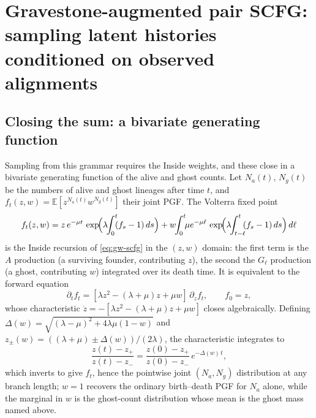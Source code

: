 \documentclass{article}
\newcommand{\E}{\mathbb{E}}
\newcommand{\ins}{\lambda}
\newcommand{\del}{\mu}
\begin{document}
\section{Gravestone-augmented pair SCFG: sampling latent histories conditioned on observed alignments}
\label{appendix:sampling_scfg}
 
\subsection{Closing the sum: a bivariate generating function}
Sampling from this grammar requires the Inside weights, and these close
in a bivariate generating function of the alive and ghost counts.
Let $N_a(t)$, $N_g(t)$ be the numbers of alive and ghost lineages
after time $t$, and $f_t(z,w)=\E[z^{N_a(t)}w^{N_g(t)}]$ their joint PGF.
The Volterra fixed point
\begin{equation}
\label{eq:volterra}
f_t(z,w) = z\,e^{-\del t}\,\exp\!\Bigl(\ins\!\!\int_0^{t}\!\! (f_s - 1)\, ds\Bigr)
  + w\!\!\int_0^{t}\!\!\del e^{-\del\ell}\,\exp\!\Bigl(\ins\!\!\int_{t-\ell}^{t}\!\! (f_s - 1)\, ds\Bigr)\,d\ell
\end{equation}
is the Inside recursion of \eqref{eq:gw-scfg} in the $(z,w)$ domain: the
first term is the $A$ production (a surviving founder, contributing $z$),
the second the $G_\ell$ production (a ghost, contributing $w$)
integrated over its death time. It is equivalent to the forward equation
\begin{equation}
\label{eq:riccati}
\partial_t f_t = [\ins z^2 - (\ins{+}\del) z + \del w]\,\partial_z f_t,
\qquad f_0 = z,
\end{equation}
whose characteristic $\dot z=-[\ins z^2 - (\ins{+}\del)z + \del w]$
closes algebraically. Defining
$\Delta(w)=\sqrt{(\ins{-}\del)^2 + 4\ins\del(1-w)}$ and
$z_\pm(w)=((\ins{+}\del)\pm\Delta(w))/(2\ins)$, the characteristic
integrates to
\begin{equation}
\label{eq:riccati-flow}
\frac{z(t) - z_+}{z(t) - z_-}
= \frac{z(0) - z_+}{z(0) - z_-}\,e^{-\Delta(w)\, t},
\end{equation}
which inverts to give $f_t$, hence the pointwise joint $(N_a,N_g)$
distribution at any branch length; $w{=}1$ recovers the ordinary birth--death PGF for $N_a$
alone, while the marginal in $w$ is the ghost-count distribution
whose mean is the ghost mass named above.
\end{document}
